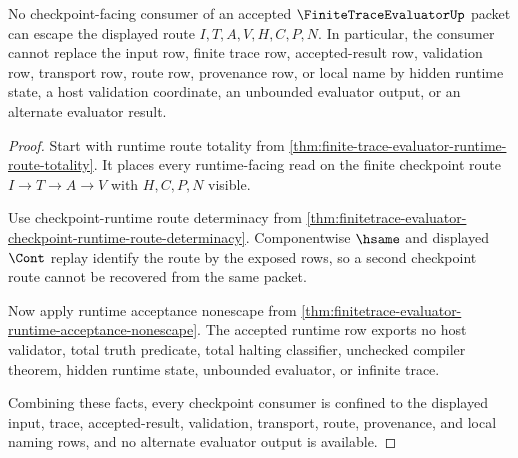 \begin{theorem}
\label{thm:finite-trace-evaluator-checkpoint-route-nonescape}
No checkpoint-facing consumer of an accepted $\FiniteTraceEvaluatorUp$ packet can escape the displayed route $I,T,A,V,H,C,P,N$. In particular, the consumer cannot replace the input row, finite trace row, accepted-result row, validation row, transport row, route row, provenance row, or local name by hidden runtime state, a host validation coordinate, an unbounded evaluator output, or an alternate evaluator result.
\end{theorem}
\begin{proof}
Start with runtime route totality from \autoref{thm:finite-trace-evaluator-runtime-route-totality}. It places every runtime-facing read on the finite checkpoint route $I \to T \to A \to V$ with $H,C,P,N$ visible.

Use checkpoint-runtime route determinacy from \autoref{thm:finitetrace-evaluator-checkpoint-runtime-route-determinacy}. Componentwise $\hsame$ and displayed $\Cont$ replay identify the route by the exposed rows, so a second checkpoint route cannot be recovered from the same packet.

Now apply runtime acceptance nonescape from \autoref{thm:finitetrace-evaluator-runtime-acceptance-nonescape}. The accepted runtime row exports no host validator, total truth predicate, total halting classifier, unchecked compiler theorem, hidden runtime state, unbounded evaluator, or infinite trace.

Combining these facts, every checkpoint consumer is confined to the displayed input, trace, accepted-result, validation, transport, route, provenance, and local naming rows, and no alternate evaluator output is available.
\end{proof}
